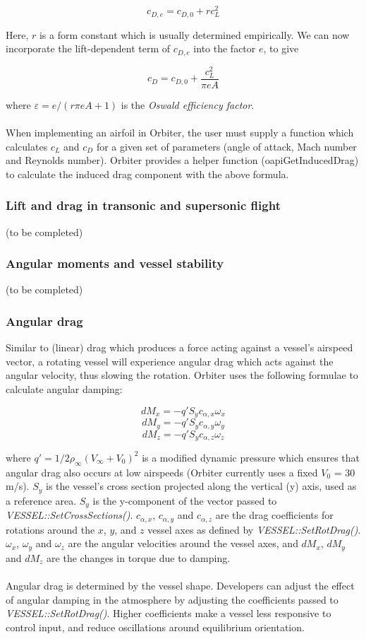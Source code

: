 \documentclass[Orbiter Developer Manual.tex]{subfiles}
\begin{document}
\[ c_{D,e} = c_{D,0} + rc_{L}^{2} \]

\noindent
Here, $r$ is a form constant which is usually determined empirically. We can now incorporate the lift-dependent term of $c_{D,e}$ into the factor $e$, to give

\[ c_{D} = c_{D,0} + \frac{c_{L}^{2}}{\pi eA} \]

\noindent
where $\varepsilon = e / (r \pi eA + 1)$ is the \textit{Oswald efficiency factor}.\\
\\
When implementing an airfoil in Orbiter, the user must supply a function which calculates $c_{L}$ and $c_{D}$ for a given set of parameters (angle of attack, Mach number and Reynolds number). Orbiter provides a helper function (oapiGetInducedDrag) to calculate the induced drag component with the above formula.


\subsubsection{Lift and drag in transonic and supersonic flight}
(to be completed)


\subsubsection{Angular moments and vessel stability}
(to be completed)


\subsubsection{Angular drag}
Similar to (linear) drag which produces a force acting against a vessel’s airspeed vector, a rotating vessel will experience angular drag which acts against the angular velocity, thus slowing the rotation. Orbiter uses the following formulae to calculate angular damping:

\[ dM_{x} = -q'S_{y}c_{\alpha,x}\omega_{x} \]
\[ dM_{y} = -q'S_{y}c_{\alpha,y}\omega_{y} \]
\[ dM_{z} = -q'S_{y}c_{\alpha,z}\omega_{z} \]

\noindent
where $q' = 1/2 \rho_{\infty}(V_{\infty} + V_{0})^{2}$ is a modified dynamic pressure which ensures that angular drag also occurs at low airspeeds (Orbiter currently uses a fixed $V_{0}$ = 30 m/s). $S_{y}$ is the vessel’s cross section projected along the vertical (y) axis, used as a reference area. $S_{y}$ is the y-component of the vector passed to \textit{VESSEL::SetCrossSections()}. $c_{\alpha,x}$, $c_{\alpha,y}$ and $c_{\alpha,z}$ are the drag coefficients for rotations around the $x$, $y$, and $z$ vessel axes as defined by \textit{VESSEL::SetRotDrag()}. $\omega_{x}$, $\omega_{y}$ and $\omega_{z}$ are the angular velocities around the vessel axes, and $dM_{x}$, $dM_{y}$ and $dM_{z}$ are the changes in torque due to damping.\\
\\
Angular drag is determined by the vessel shape. Developers can adjust the effect of angular damping in the atmosphere by adjusting the coefficients passed to \textit{VESSEL::SetRotDrag()}. Higher coefficients make a vessel less responsive to control input, and reduce oscillations around equilibrium orientation.
\end{document}
